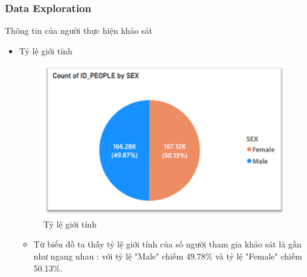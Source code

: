 \subsubsection{Data Exploration}
Thông tin của người thực hiện khảo sát
\begin{itemize}[label=$-$]
\item  Tỷ lệ giới tính 
\begin{center}
            \begin{figure}[!h]
                \centering
                \includegraphics[scale = 0.8]{figures/Hoa/DE1.1.png}
              \caption{Tỷ lệ giới tính}
            \end{figure}
\end{center}
\begin{itemize}[label=$+$]
\item Từ biểu đồ ta thấy tỷ lệ giới tính của số người tham gia khảo sát là gần như ngang nhau : với tỷ lệ "Male" chiếm 49.78\% và tỷ lệ "Female" chiếm 50.13\%.
\end{itemize}


\end{itemize}
